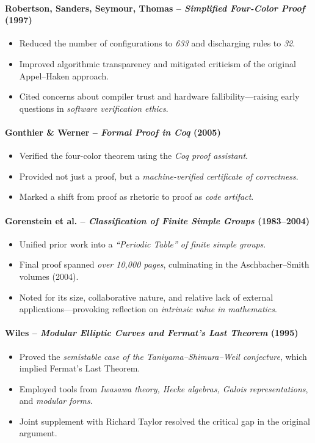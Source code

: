 \documentclass[9pt]{article}
\begin{document}
\paragraph{Robertson, Sanders, Seymour, Thomas – \textit{Simplified Four-Color Proof} (1997)}
\begin{itemize}
  \item Reduced the number of configurations to \textit{633} and discharging rules to \textit{32}.
  \item Improved algorithmic transparency and mitigated criticism of the original Appel--Haken approach.
  \item Cited concerns about compiler trust and hardware fallibility---raising early questions in \textit{software verification ethics}.
\end{itemize}

\paragraph{Gonthier \& Werner – \textit{Formal Proof in Coq} (2005)}
\begin{itemize}
  \item Verified the four-color theorem using the \textit{Coq proof assistant}.
  \item Provided not just a proof, but a \textit{machine-verified certificate of correctness}.
  \item Marked a shift from proof as rhetoric to proof as \textit{code artifact}.
\end{itemize}

\paragraph{Gorenstein et al. – \textit{Classification of Finite Simple Groups} (1983--2004)}
\begin{itemize}
  \item Unified prior work into a \textit{“Periodic Table” of finite simple groups}.
  \item Final proof spanned \textit{over 10,000 pages}, culminating in the Aschbacher--Smith volumes (2004).
  \item Noted for its size, collaborative nature, and relative lack of external applications---provoking reflection on \textit{intrinsic value in mathematics}.
\end{itemize}

\paragraph{Wiles – \textit{Modular Elliptic Curves and Fermat’s Last Theorem} (1995)}
\begin{itemize}
  \item Proved the \textit{semistable case of the Taniyama--Shimura--Weil conjecture}, which implied Fermat’s Last Theorem.
  \item Employed tools from \textit{Iwasawa theory, Hecke algebras, Galois representations}, and \textit{modular forms}.
  \item Joint supplement with Richard Taylor resolved the critical gap in the original argument.
\end{itemize}
\end{document}
